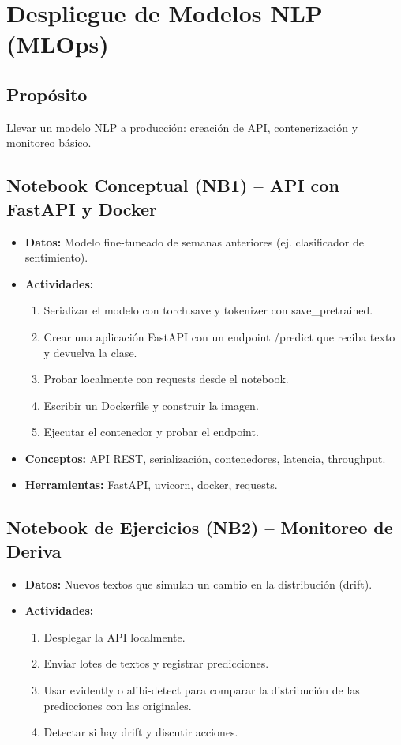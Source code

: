 \documentclass[12pt,a4paper]{article}
\begin{document}
\section{Despliegue de Modelos NLP (MLOps)}
\subsection*{Propósito}
Llevar un modelo NLP a producción: creación de API, contenerización y monitoreo básico.

\subsection*{Notebook Conceptual (NB1) – API con FastAPI y Docker}
\begin{itemize}
    \item \textbf{Datos:} Modelo fine-tuneado de semanas anteriores (ej. clasificador de sentimiento).
    \item \textbf{Actividades:}
    \begin{enumerate}
        \item Serializar el modelo con torch.save y tokenizer con save\_pretrained.
        \item Crear una aplicación FastAPI con un endpoint /predict que reciba texto y devuelva la clase.
        \item Probar localmente con requests desde el notebook.
        \item Escribir un Dockerfile y construir la imagen.
        \item Ejecutar el contenedor y probar el endpoint.
    \end{enumerate}
    \item \textbf{Conceptos:} API REST, serialización, contenedores, latencia, throughput.
    \item \textbf{Herramientas:} FastAPI, uvicorn, docker, requests.
\end{itemize}

\subsection*{Notebook de Ejercicios (NB2) – Monitoreo de Deriva}
\begin{itemize}
    \item \textbf{Datos:} Nuevos textos que simulan un cambio en la distribución (drift).
    \item \textbf{Actividades:}
    \begin{enumerate}
        \item Desplegar la API localmente.
        \item Enviar lotes de textos y registrar predicciones.
        \item Usar evidently o alibi-detect para comparar la distribución de las predicciones con las originales.
        \item Detectar si hay drift y discutir acciones.
    \end{enumerate}
\end{itemize}
\end{document}
